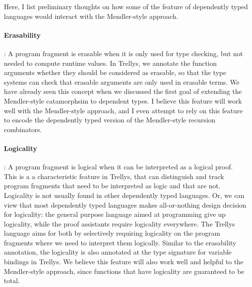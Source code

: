 \documentclass[letterpaper,12pt]{article}
\begin{document}
Here, I list preliminary thoughts on how some of the feature of
dependently typed languages would interact with the Mendler-style approach.

\paragraph{Erasability}: A program fragment is erasable when it is only used
for type checking, but not needed to compute runtime values.  In Trellys, we
annotate the function arguments whether they should be considered as erasable,
so that the type systems can check that erasable arguments are only used in
erasable terms. We have already seen this concept when we discussed
the first goal of extending the Mendler-style catamorphsim to dependent types.
I believe this feature will work well with the Mendler-style approach,
and I even attempt to rely on this feature to encode the dependently typed
version of the Mendler-style recursion combinators.

\paragraph{Logicality}: A program fragment is logical when it can be
interpreted as a logical proof.  This is a a characteristic feature in Trellys,
that can distinguish and track program fragments that need to be interpreted
as logic and that are not.  Logicality is not usually found in other
dependently typed languages.  Or, we can view that most dependently
typed languages makes all-or-nothing design decision for logicality:
the general purpose language aimed at programming give up logicality,
while the proof assistants require logicality everywhere.
The Trellys language aims for both by selectively requiring logicality on
the program fragments where we need to interpret them logically.
Similar to the erasability annotation, the logicality is also
annotated at the type signature for variable bindings in Trellys.
We believe this feature will also work well and helpful to
the Mendler-style approach, since functions that have logicality
are guaranteed to be total.
\end{document}

